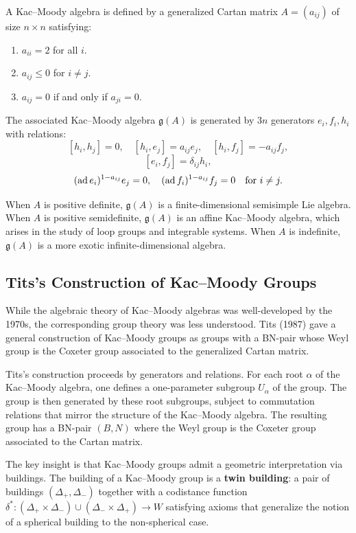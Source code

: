 A Kac--Moody algebra is defined by a generalized Cartan matrix \(A = (a_{ij})\) of size \(n \times n\) satisfying:
\begin{enumerate}
    \item \(a_{ii} = 2\) for all \(i\).
    \item \(a_{ij} \leq 0\) for \(i \neq j\).
    \item \(a_{ij} = 0\) if and only if \(a_{ji} = 0\).
\end{enumerate}
The associated Kac--Moody algebra \(\mathfrak{g}(A)\) is generated by \(3n\) generators \(e_i, f_i, h_i\) with relations:
\[
[h_i, h_j] = 0,\quad [h_i, e_j] = a_{ij} e_j,\quad [h_i, f_j] = -a_{ij} f_j,
\]
\[
[e_i, f_j] = \delta_{ij} h_i,
\]
\[
(\operatorname{ad} e_i)^{1-a_{ij}} e_j = 0,\quad (\operatorname{ad} f_i)^{1-a_{ij}} f_j = 0 \quad \text{for } i \neq j.
\]

When \(A\) is positive definite, \(\mathfrak{g}(A)\) is a finite-dimensional semisimple Lie algebra. When \(A\) is positive semidefinite, \(\mathfrak{g}(A)\) is an affine Kac--Moody algebra, which arises in the study of loop groups and integrable systems. When \(A\) is indefinite, \(\mathfrak{g}(A)\) is a more exotic infinite-dimensional algebra.

\subsection{Tits's Construction of Kac--Moody Groups}

While the algebraic theory of Kac--Moody algebras was well-developed by the 1970s, the corresponding group theory was less understood. Tits (1987) gave a general construction of Kac--Moody groups as groups with a BN-pair whose Weyl group is the Coxeter group associated to the generalized Cartan matrix.

Tits's construction proceeds by generators and relations. For each root \(\alpha\) of the Kac--Moody algebra, one defines a one-parameter subgroup \(U_\alpha\) of the group. The group is then generated by these root subgroups, subject to commutation relations that mirror the structure of the Kac--Moody algebra. The resulting group has a BN-pair \((B, N)\) where the Weyl group is the Coxeter group associated to the Cartan matrix.

The key insight is that Kac--Moody groups admit a geometric interpretation via buildings. The building of a Kac--Moody group is a \textbf{twin building}: a pair of buildings \((\Delta_+, \Delta_-)\) together with a codistance function \(\delta^*: (\Delta_+ \times \Delta_-) \cup (\Delta_- \times \Delta_+) \to W\) satisfying axioms that generalize the notion of a spherical building to the non-spherical case.

